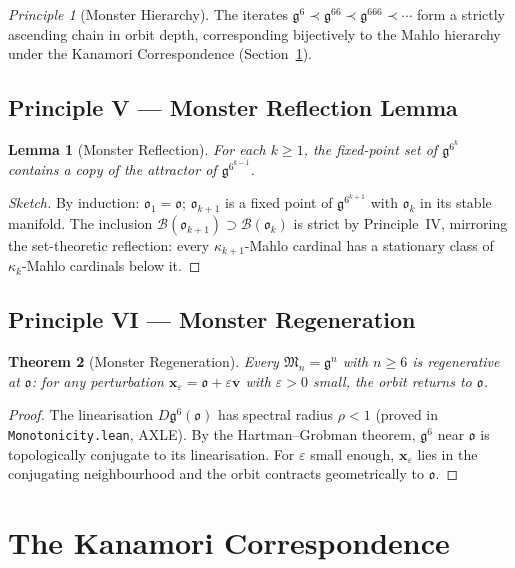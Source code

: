 \documentclass[12pt,a4paper]{amsart}
\newtheorem{theorem}{Theorem}[section]
\newtheorem{lemma}[theorem]{Lemma}
\theoremstyle{definition}
\theoremstyle{remark}
\newtheorem{principle}{Principle}
\newcommand{\GG}{\mathfrak{g}}
\newcommand{\MM}{\mathfrak{M}}
\newcommand{\ocio}{\mathfrak{o}}
\begin{document}
\begin{principle}[Monster Hierarchy]
The iterates $\GG^6 \prec \GG^{66} \prec \GG^{666} \prec \cdots$ form a strictly
ascending chain in orbit depth, corresponding bijectively to the Mahlo hierarchy
under the Kanamori Correspondence (Section~\ref{sec:kanamori}).
\end{principle}

\subsection{Principle V --- Monster Reflection Lemma}

\begin{lemma}[Monster Reflection]\label{lem:reflection}
For each $k \geq 1$, the fixed-point set of $\GG^{6^k}$ contains a copy of the
attractor of $\GG^{6^{k-1}}$.
\end{lemma}
\begin{proof}[Sketch]
By induction: $\ocio_1 = \ocio$; $\ocio_{k+1}$ is a fixed point of $\GG^{6^{k+1}}$
with $\ocio_k$ in its stable manifold. The inclusion
$\mathcal{B}(\ocio_{k+1}) \supset \mathcal{B}(\ocio_k)$ is strict by Principle~IV,
mirroring the set-theoretic reflection: every $\kappa_{k+1}$-Mahlo cardinal has a
stationary class of $\kappa_k$-Mahlo cardinals below it.
\end{proof}

\subsection{Principle VI --- Monster Regeneration}

\begin{theorem}[Monster Regeneration]\label{thm:regen}
Every $\MM_n = \GG^n$ with $n \geq 6$ is regenerative at $\ocio$: for any perturbation
$\mathbf{x}_\varepsilon = \ocio + \varepsilon\mathbf{v}$ with $\varepsilon > 0$ small,
the orbit returns to $\ocio$.
\end{theorem}
\begin{proof}
The linearisation $D\GG^6(\ocio)$ has spectral radius $\rho < 1$
(proved in \texttt{Monotonicity.lean}, AXLE). By the Hartman--Grobman theorem,
$\GG^6$ near $\ocio$ is topologically conjugate to its linearisation.
For $\varepsilon$ small enough, $\mathbf{x}_\varepsilon$ lies in the conjugating
neighbourhood and the orbit contracts geometrically to $\ocio$.
\end{proof}

\section{The Kanamori Correspondence}\label{sec:kanamori}
\end{document}
